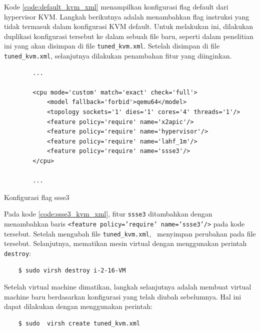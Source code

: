 Kode \ref{code:default_kvm_xml} menampilkan konfigurasi flag default dari hypervisor KVM. Langkah berikutnya adalah menambahkan flag instruksi yang tidak termasuk dalam konfigurasi KVM default. Untuk melakukan ini, dilakukan duplikasi konfigurasi tersebut ke dalam sebuah file baru, seperti dalam penelitian ini yang akan disimpan di file \texttt{tuned\_kvm.xml}. Setelah disimpan di file \texttt{tuned\_kvm.xml}, selanjutnya dilakukan penambahan fitur yang diinginkan.

\begin{listing}[H]
    \begin{verbatim}
        ...

        <cpu mode='custom' match='exact' check='full'>
            <model fallback='forbid'>qemu64</model>
            <topology sockets='1' dies='1' cores='4' threads='1'/>
            <feature policy='require' name='x2apic'/>
            <feature policy='require' name='hypervisor'/> 
            <feature policy='require' name='lahf_1m'/>
            <feature policy='require' name='ssse3'/>
        </cpu>
        
        ...
    \end{verbatim}
    \caption{Konfigurasi flag ssse3}
    \label{code:ssse3_kvm_xml}
\end{listing}

Pada kode \ref{code:ssse3_kvm_xml}, fitur \texttt{ssse3} ditambahkan dengan menambahkan baris \texttt{<feature policy='require' name='ssse3'/>} pada kode tersebut. Setelah mengubah file \texttt{tuned\_kvm.xml}, \saya\ menyimpan perubahan pada file tersebut. Selanjutnya, mematikan mesin virtual dengan menggunakan perintah \texttt{destroy}:

\begin{listing}[H]
    \begin{verbatim}
    $ sudo virsh destroy i-2-16-VM
    \end{verbatim}
\end{listing}

Setelah virtual machine dimatikan, langkah selanjutnya adalah membuat virtual machine baru berdasarkan konfigurasi yang telah diubah sebelumnya. Hal ini dapat dilakukan dengan menggunakan perintah:

\begin{listing}[H]
    \begin{verbatim}
    $ sudo  virsh create tuned_kvm.xml
    \end{verbatim}
\end{listing}

